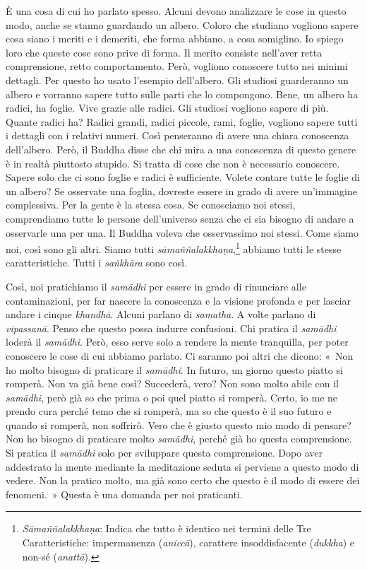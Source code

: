 È una cosa di cui ho parlato spesso. Alcuni devono analizzare le cose in
questo modo, anche se stanno guardando un albero. Coloro che studiano
vogliono sapere cosa siano i meriti e i demeriti, che forma abbiano, a
cosa somiglino. Io spiego loro che queste cose sono prive di forma. Il
merito consiste nell'aver retta comprensione, retto comportamento. Però,
vogliono conoscere tutto nei minimi dettagli. Per questo ho usato
l'esempio dell'albero. Gli studiosi guarderanno un albero e vorranno
sapere tutto sulle parti che lo compongono. Bene, un albero ha radici,
ha foglie. Vive grazie alle radici. Gli studiosi vogliono sapere di più.
Quante radici ha? Radici grandi, radici piccole, rami, foglie, vogliono
sapere tutti i dettagli con i relativi numeri. Così penseranno di avere
una chiara conoscenza dell'albero. Però, il Buddha disse che chi mira a
una conoscenza di questo genere è in realtà piuttosto stupido. Si tratta
di cose che non è necessario conoscere. Sapere solo che ci sono foglie e
radici è sufficiente. Volete contare tutte le foglie di un albero? Se
osservate una foglia, dovreste essere in grado di avere un'immagine
complessiva. Per la gente è la stessa cosa. Se conosciamo noi stessi,
comprendiamo tutte le persone dell'universo senza che ci sia bisogno di
andare a osservarle una per una. Il Buddha voleva che osservassimo noi
stessi. Come siamo noi, così sono gli altri. Siamo tutti
\emph{sāmaññalakkhaṇa},\footnote{\emph{Sāmaññalakkhaṇa}: Indica che
  tutto è identico nei termini delle Tre Caratteristiche: impermanenza
  (\emph{aniccā}), carattere insoddisfacente (\emph{dukkha}) e non-sé
  (\emph{anattā}).} abbiamo tutti le stesse caratteristiche. Tutti i
\emph{saṅkhāra} sono così.

Così, noi pratichiamo il \emph{samādhi} per essere in grado di
rinunciare alle contaminazioni, per far nascere la conoscenza e la
visione profonda e per lasciar andare i cinque \emph{khandhā}. Alcuni
parlano di \emph{samatha}. A volte parlano di \emph{vipassanā}. Penso
che questo possa indurre confusioni. Chi pratica il \emph{samādhi}
loderà il \emph{samādhi}. Però, esso serve solo a rendere la mente
tranquilla, per poter conoscere le cose di cui abbiamo parlato. Ci
saranno poi altri che dicono: «~Non ho molto bisogno di praticare il
\emph{samādhi}. In futuro, un giorno questo piatto si romperà. Non va
già bene così? Succederà, vero? Non sono molto abile con il
\emph{samādhi}, però già so che prima o poi quel piatto si romperà.
Certo, io me ne prendo cura perché temo che si romperà, ma so che questo
è il suo futuro e quando si romperà, non soffrirò. Vero che è giusto
questo mio modo di pensare? Non ho bisogno di praticare molto
\emph{samādhi}, perché già ho questa comprensione. Si pratica il
\emph{samādhi} solo per sviluppare questa comprensione. Dopo aver
addestrato la mente mediante la meditazione seduta si perviene a questo
modo di vedere. Non la pratico molto, ma già sono certo che questo è il
modo di essere dei fenomeni.~» Questa è una domanda per noi praticanti.

